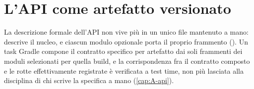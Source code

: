 \section{L'API come artefatto versionato}

La descrizione formale dell'API non vive pi\`u in un unico file mantenuto a
mano:  descrive il nucleo, e ciascun modulo opzionale
porta il proprio frammento (). Un
task Gradle compone il contratto specifico per artefatto dai soli frammenti
dei moduli selezionati per quella build, e la corrispondenza fra il contratto
composto e le rotte effettivamente registrate \`e verificata a test time,
non pi\`u lasciata alla disciplina di chi scrive la specifica a mano
(\cref{cap:A-api}).

